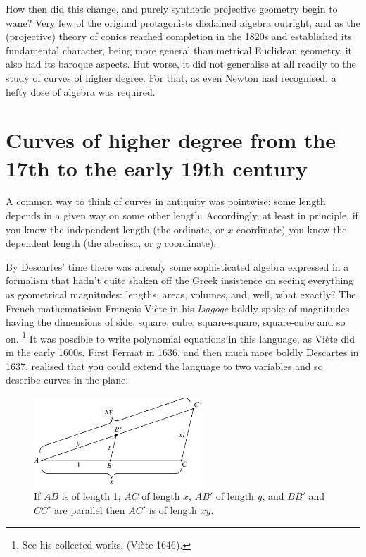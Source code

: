 How then did this change, and purely synthetic projective geometry
%
begin to wane? Very few of the original protagonists disdained algebra
outright, and as the (projective) theory of conics reached completion in
the 1820s and established its fundamental character, being more general
than metrical Euclidean geometry, it also had its baroque aspects. But
worse, it did not generalise at all readily  to the study of curves of
higher degree. For that, as even Newton had recognised, a hefty dose of
algebra was required.


\section{Curves of higher degree from the 17th to the early 19th century}
A common way to think of curves in antiquity was pointwise: some length
depends in a given way on some other length. Accordingly, at least in
principle, if you know the independent length
(the ordinate, or $x$ coordinate)
%
 you know the dependent length (the
abscissa, or $y$ coordinate).

By Descartes' time there was already some sophisticated algebra expressed
in a formalism that hadn't quite shaken off   the Greek insistence on
seeing everything as geometrical magnitudes: lengths, areas, volumes, and,
well, what exactly? The French mathematician Fran\c{c}ois Vi\`ete
%
in his
\emph{Isagoge} boldly spoke of magnitudes having the dimensions of side,
square, cube, square-square,
%
 square-cube and so on.%
%
\footnote{See his collected works, (Vi\`ete 1646).} 
%
It was possible to write polynomial
equations in this language, as Vi\`ete did in the early 1600s. First
Fermat
%
in 1636, and then much more boldly Descartes
%
in 1637, realised
that you could extend the language to two variables and so describe
curves in the plane.


\begin{figure}
  \includegraphics[width=180pt]{main/Multiplication}
\caption{If $AB$ is of length 1, $AC$ of length $x$, $AB'$ of
length $y$, and $BB'$ and $CC'$ are parallel then $AC'$ is of length $xy$.
}
      \label{figmultiplication}
\end{figure}

